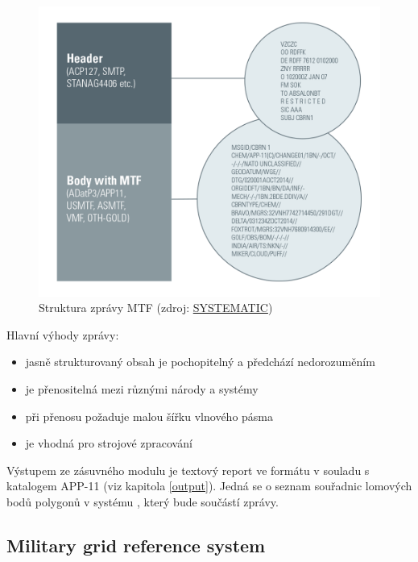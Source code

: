 \begin{figure}[H]
    \centering
      \includegraphics[width=350pt]{./pictures/Military-Messaging-white-borders-988px.png}
      \caption[Struktura zprávy MTF]{Struktura zprávy MTF
      (zdroj: \href{https://systematic.com/defence/products/a/military-messaging/app-11-and-adatp-3/}{SYSTEMATIC})}
      \label{fig:systematic}
  \end{figure}
  
Hlavní výhody  zprávy:

\begin{itemize}
	\item{jasně strukturovaný obsah je pochopitelný a předchází nedorozuměním}
	\item{je přenositelná mezi různými národy a systémy}
	\item{při přenosu požaduje malou šířku vlnového pásma}
	\item{je vhodná pro strojové zpracování}
\end{itemize}

Výstupem ze zásuvného modulu je textový report ve formátu v souladu s
katalogem APP-11 (viz kapitola \ref{output}). Jedná se o seznam 
souřadnic lomových bodů polygonů v systému , který bude 
součástí  zprávy.

\subsection{Military grid reference system}

